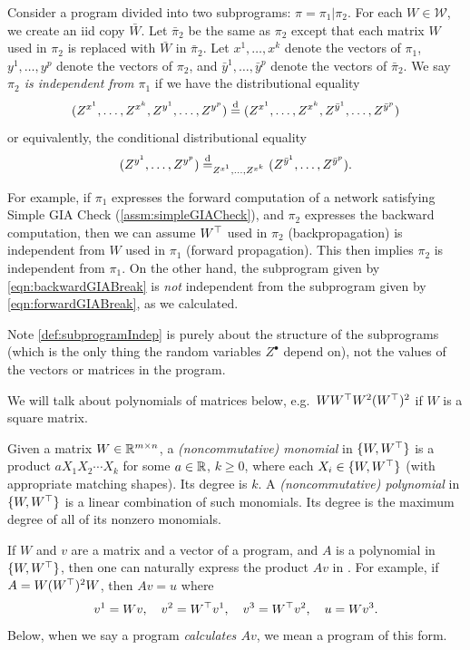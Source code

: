 \documentclass[main.tex]{subfiles}
\begin{document}
\begin{defn}
\label{def:subprogramIndep}Consider a program divided into two subprograms: $\pi=\pi_{1}|\pi_{2}$. For each $W\in\mathcal{W}$, we create an iid copy $\bar{W}$. Let $\bar{\pi}_{2}$ be the same as $\pi_{2}$ except that each matrix $W$ used in $\pi_{2}$ is replaced with $\bar{W}$ in $\bar{\pi}_{2}$. Let $x^{1},\ldots,x^{k}$ denote the vectors of $\pi_{1}$, $y^{1},\ldots,y^{p}$ denote the vectors of $\pi_{2}$, and $\bar{y}^{1},\ldots,\bar{y}^{p}$ denote the vectors of $\bar{\pi}_{2}$. We say \emph{$\pi_{2}$ is independent from $\pi_{1}$} if we have the distributional equality
\[
(Z^{x^{1}},\ldots,Z^{x^{k}},Z^{y^{1}},\ldots,Z^{y^{p}})\overset{\mathrm{d}}{=}(Z^{x^{1}},\ldots,Z^{x^{k}},Z^{\bar{y}^{1}},\ldots,Z^{\bar{y}^{p}})
\]
or equivalently, the conditional distributional equality
\[
(Z^{y^{1}},\ldots,Z^{y^{p}})\overset{\mathrm{d}}{=}_{Z^{x^{1}},\ldots,Z^{x^{k}}}(Z^{\bar{y}^{1}},\ldots,Z^{\bar{y}^{p}}).
\]
\end{defn}

For example, if $\pi_{1}$ expresses the forward computation of a network satisfying Simple GIA Check (\cref{assm:simpleGIACheck}), and $\pi_{2}$ expresses the backward computation, then we can assume $W^\top$ used in $\pi_2$ (backpropagation) is independent from $W$ used in $\pi_1$ (forward propagation).
This then implies $\pi_{2}$ is independent from $\pi_{1}$.
On the other hand, the subprogram given by \cref{eqn:backwardGIABreak} is \emph{not} independent from the subprogram given by \cref{eqn:forwardGIABreak}, as we calculated.

Note \cref{def:subprogramIndep} is purely about the structure of the subprograms (which is the only thing the random variables $Z^\bullet$ depend on), not the values of the vectors or matrices in the program.

We will talk about polynomials of matrices below, e.g.\ $WW^\top W^2 (W^\top)^2$ if $W$ is a square matrix.
\begin{defn}
    Given a matrix $W \in \mathbb{R}^{m\times n}$, a \emph{(noncommutative) monomial} in $\{W, W^\top\}$ is a product $a X_1 X_2 \cdots X_k$ for some $a\in \mathbb{R}$, $k \ge 0$, where each $X_i \in \{W, W^\top\}$ (with appropriate matching shapes).
    Its degree is $k$.
    A \emph{(noncommutative) polynomial} in  $\{W, W^\top\}$ is a linear combination of such monomials.
    Its degree is the maximum degree of all of its nonzero monomials.
\end{defn}
\begin{rem}\label{rem:calculatingPolynomial}
    If $W$ and $v$ are a matrix and a vector of a program, and $A$ is a polynomial in $\{W,W^\top\}$, then one can naturally express the product $Av$ in \netsort{}.
    For example, if $A = W (W^\top)^2 W$, then $Av = u$ where
    \[
        v^1 = Wv,\quad
        v^2 = W^\top v^1,\quad
        v^3 = W^\top v^2,\quad
        u = W v^3.\]
    Below, when we say a program \emph{calculates $Av$}, we mean a program of this form.
\end{rem}
\end{document}
